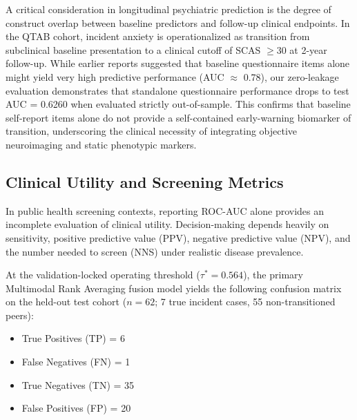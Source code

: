 \documentclass[10pt,letterpaper]{article}
\begin{document}
A critical consideration in longitudinal psychiatric prediction is the degree of construct overlap between baseline predictors and follow-up clinical endpoints. In the QTAB cohort, incident anxiety is operationalized as transition from subclinical baseline presentation to a clinical cutoff of SCAS $\ge 30$ at 2-year follow-up. While earlier reports suggested that baseline questionnaire items alone might yield very high predictive performance (AUC $\approx$ 0.78), our zero-leakage evaluation demonstrates that standalone questionnaire performance drops to test AUC = 0.6260 when evaluated strictly out-of-sample. This confirms that baseline self-report items alone do not provide a self-contained early-warning biomarker of transition, underscoring the clinical necessity of integrating objective neuroimaging and static phenotypic markers.

\subsection*{Clinical Utility and Screening Metrics}

In public health screening contexts, reporting ROC-AUC alone provides an incomplete evaluation of clinical utility. Decision-making depends heavily on sensitivity, positive predictive value (PPV), negative predictive value (NPV), and the number needed to screen (NNS) under realistic disease prevalence.

At the validation-locked operating threshold ($\tau^* = 0.564$), the primary Multimodal Rank Averaging fusion model yields the following confusion matrix on the held-out test cohort ($n=62$; 7 true incident cases, 55 non-transitioned peers):
\begin{itemize}
    \item True Positives (TP) = 6
    \item False Negatives (FN) = 1
    \item True Negatives (TN) = 35
    \item False Positives (FP) = 20
\end{itemize}
\end{document}
